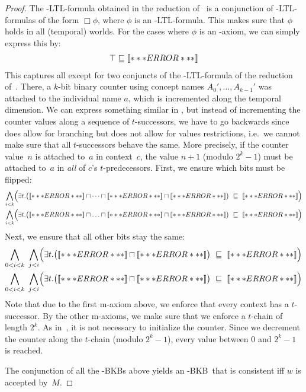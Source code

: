 \begin{proof}
  The \ALC-LTL-formula obtained in the reduction of~\cite{BaGL-KR08,BaGL-ToCL12} is a conjunction of
  \ALC-LTL-formulas of the form $\Box\phi$, where $\phi$ is an \ALC-LTL-formula.  This makes sure
  that $\phi$ holds in all (temporal) worlds.  For the cases where $\phi$ is an \ALC-axiom, we can
  simply express this by:
  \begin{gather*}
    \top\sqsubseteq\oax{\phi}
  \end{gather*}
  This captures all except for two conjuncts of the \ALC-LTL-formula of the reduction
  of~\cite{BaGL-KR08,BaGL-ToCL12}.  There, a $k$-bit binary counter using concept names
  $A_0',\dots,A_{k-1}'$ was attached to the individual name $a$, which is incremented along the
  temporal dimension.  We can express something similar in \ELALC, but instead of incrementing the
  counter values along a sequence of $t$-successors, we have to go backwards since \EL does allow
  for branching but does not allow for values restrictions, i.e.~we cannot make sure that all
  $t$-successors behave the same.  More precisely, if the counter value~$n$ is attached to~$a$ in
  context~$c$, the value $n+1$ (modulo $2^k-1$) must be attached to~$a$ in \emph{all} of $c$'s
  $t$-predecessors.
  First, we ensure which bits must be flipped:
  \begin{align*}
    \bigwedge_{i<k} \Bigl( \exists t.\bigl(\oax{A_{0}'(a)} \sqcap \dots \sqcap \oax{A_{i-1}'(a)} \sqcap \oax{A_{i}'(a)}\bigr)
    & \ \sqsubseteq\ \oax{(\lnot A_{i}')(a)}\Bigr)\\ 
    \bigwedge_{i<k}\Bigl( \exists t.\bigl(\oax{A_{0}'(a)}\sqcap\ldots\sqcap \oax{A_{i-1}'(a)} \sqcap \oax{(\lnot A_{i}')(a)}\bigr)
    & \ \sqsubseteq\ \oax{A_{i}'(a)}\Bigr)
  \end{align*}
  Next, we ensure that all other bits stay the same:
  \begin{align*}
    \bigwedge_{0<i<k}\ \bigwedge_{j<i}\Bigl(\exists t.\bigl(\oax{(\lnot A_{j}')(a)}\sqcap\oax{A_{i}'(a)}\bigr)
    & \ \sqsubseteq\ \oax{A_{i}'(a)}\Bigr)\\
    \bigwedge_{0<i<k}\ \bigwedge_{j<i}\Bigl(\exists t.\bigl(\oax{(\lnot A_{j}')(a)}\sqcap\oax{(\lnot A_{i}')(a)}\bigr)
    & \ \sqsubseteq\ \oax{(\lnot A_{i}')(a)}\Bigr)
  \end{align*}
  Note that due to the first m-axiom above, we enforce that every context has a $t$-successor.  By
  the other m-axioms, we make sure that we enforce a $t$-chain of length $2^k$.
  As in~\cite{BaGL-KR08,BaGL-ToCL12}, it is not necessary to initialize the counter.  Since we
  decrement the counter along the $t$-chain (modulo $2^k-1$), every value between $0$ and $2^k-1$
  is reached.
  
  The conjunction of all the \ELALC-BKBs above yields an \ELALC-BKB~\B that is consistent iff $w$
  is accepted by~$M$.
\end{proof}

